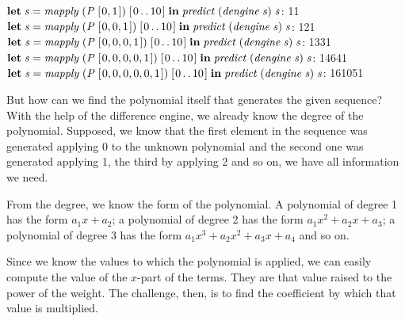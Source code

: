\documentclass[tikz]{scrreprt}
\newcommand{\Conid}[1]{\mathit{#1}}
\newcommand{\Varid}[1]{\mathit{#1}}
\begin{document}
\begin{minipage}{\textwidth}
\ensuremath{\mathbf{let}\;\Varid{s}\mathrel{=}\Varid{mapply}\;(\Conid{P}\;[\mskip1.5mu \mathrm{0},\mathrm{1}\mskip1.5mu])\;[\mskip1.5mu \mathrm{0}\mathinner{\ldotp\ldotp}\mathrm{10}\mskip1.5mu]\;\mathbf{in}\;\Varid{predict}\;(\Varid{dengine}\;\Varid{s})\;\Varid{s}}: 11\\
\ensuremath{\mathbf{let}\;\Varid{s}\mathrel{=}\Varid{mapply}\;(\Conid{P}\;[\mskip1.5mu \mathrm{0},\mathrm{0},\mathrm{1}\mskip1.5mu])\;[\mskip1.5mu \mathrm{0}\mathinner{\ldotp\ldotp}\mathrm{10}\mskip1.5mu]\;\mathbf{in}\;\Varid{predict}\;(\Varid{dengine}\;\Varid{s})\;\Varid{s}}: 121\\
\ensuremath{\mathbf{let}\;\Varid{s}\mathrel{=}\Varid{mapply}\;(\Conid{P}\;[\mskip1.5mu \mathrm{0},\mathrm{0},\mathrm{0},\mathrm{1}\mskip1.5mu])\;[\mskip1.5mu \mathrm{0}\mathinner{\ldotp\ldotp}\mathrm{10}\mskip1.5mu]\;\mathbf{in}\;\Varid{predict}\;(\Varid{dengine}\;\Varid{s})\;\Varid{s}}: 1331\\
\ensuremath{\mathbf{let}\;\Varid{s}\mathrel{=}\Varid{mapply}\;(\Conid{P}\;[\mskip1.5mu \mathrm{0},\mathrm{0},\mathrm{0},\mathrm{0},\mathrm{1}\mskip1.5mu])\;[\mskip1.5mu \mathrm{0}\mathinner{\ldotp\ldotp}\mathrm{10}\mskip1.5mu]\;\mathbf{in}\;\Varid{predict}\;(\Varid{dengine}\;\Varid{s})\;\Varid{s}}: 14641\\
\ensuremath{\mathbf{let}\;\Varid{s}\mathrel{=}\Varid{mapply}\;(\Conid{P}\;[\mskip1.5mu \mathrm{0},\mathrm{0},\mathrm{0},\mathrm{0},\mathrm{0},\mathrm{1}\mskip1.5mu])\;[\mskip1.5mu \mathrm{0}\mathinner{\ldotp\ldotp}\mathrm{10}\mskip1.5mu]\;\mathbf{in}\;\Varid{predict}\;(\Varid{dengine}\;\Varid{s})\;\Varid{s}}: 161051
\end{minipage}

But how can we find the polynomial itself that generates the given sequence?
With the help of the difference engine, we already know
the degree of the polynomial. 
Supposed, we know that the first element in the sequence
was generated applying 0 to the unknown polynomial and
the second one was generated applying 1,
the third by applying 2 and so on,
we have all information we need.

From the degree, we know the form of the polynomial.
A polynomial of degree 1 has the form $a_1x + a_2$;
a polynomial of degree 2 has the form $a_1x^2 + a_2x + a_3$;
a polynomial of degree 3 has the form $a_1x^3 + a_2x^2 + a_3x + a_4$
and so on.

Since we know the values to which the polynomial is applied,
we can easily compute the value of the $x$-part of the terms.
They are that value raised to the power of the weight.
The challenge, then, is to find the coefficient by which
that value is multiplied.
\end{document}
